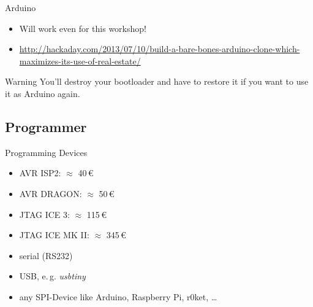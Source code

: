 \documentclass{beamer}
\begin{document}

\begin{frame}{Arduino}
    \begin{itemize}
        \item Will work even for this workshop!
        \item \url{http://hackaday.com/2013/07/10/build-a-bare-bones-arduino-clone-which-maximizes-its-use-of-real-estate/}
    \end{itemize}
    \pause
    \begin{alertblock}{Warning}
        You'll destroy your bootloader and have to restore it if you
        want to use it as Arduino again.
    \end{alertblock}
\end{frame}

\subsection{Programmer}

\begin{frame}{Programming Devices}
    \begin{itemize}
        \item{AVR ISP2: $\approx$ 40\,€}
        \item{AVR DRAGON: $\approx$ 50\,€}
        \item{JTAG ICE 3: $\approx$ 115\,€}
        \item{JTAG ICE MK II: $\approx$ 345\,€}
        \pause
        \item{serial (RS232)}
        \item{USB, e.\,g. \emph{usbtiny}}
        \item{any SPI-Device like Arduino, Raspberry Pi, r0ket, …}
    \end{itemize}
\end{frame}

\end{document}
